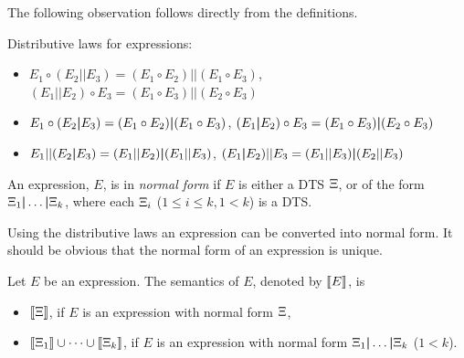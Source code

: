 The following observation follows directly from the definitions.
\begin{obs}
  \label{obs-dist-laws}
  Distributive laws for  expressions:
\begin{itemize}[noitemsep]
  \item
    $E_1\circ(E_2||E_3)=(E_1\circ E_2)||(E_1\circ E_3)$,
      $(E_1||E_2)\circ E_3=(E_1\circ E_3)||(E_2\circ E_3)$
       \item
         $E_1\circ(E_2\boldsymbol{|} E_3)=(E_1\circ E_2)\boldsymbol{|}(E_1\circ E_3)$,
           $(E_1\boldsymbol{|} E_2)\circ E_3=(E_1\circ E_3)\boldsymbol{|}(E_2\circ E_3)$
            \item
              $E_1||(E_2\boldsymbol{|} E_3)=(E_1||E_2)\boldsymbol{|}(E_1||E_3)$,
      $(E_1\boldsymbol{|} E_2)||E_3=(E_1||E_3)\boldsymbol{|}(E_2||E_3)$
    \end{itemize}
  \end{obs}
\begin{definition}
  \label{def-simple-normal-form}
  An expression, $E$, is in \emph{normal form} if $E$ is
  either a DTS $\Xi$, or of the form
  $\Xi_1\boldsymbol{|}\dots\boldsymbol{|}\Xi_k$, where each $\Xi_i$
  ($1\leq i\leq k, 1<k$) is a DTS.
\end{definition}
\noindent
Using the distributive laws an
expression can be converted into normal form. It should be obvious
that the normal form of an expression is unique.
\begin{obs}
  \label{obs-exp-sem}
Let $E$ be an expression. The semantics of $E$, denoted by
$\llbracket E \rrbracket$, is
\begin{itemize}[noitemsep]
  \item
  $\llbracket \Xi \rrbracket$, if $E$ is an
  expression with normal form $\Xi$,
\item
  $\llbracket \Xi_1 \rrbracket\cup\dots\cup\llbracket \Xi_k \rrbracket$, if $E$ is an
   expression with normal form $\Xi_1\boldsymbol{|}\dots\boldsymbol{|}\Xi_k$
  ($1<k$).
\end{itemize}
\end{obs}
